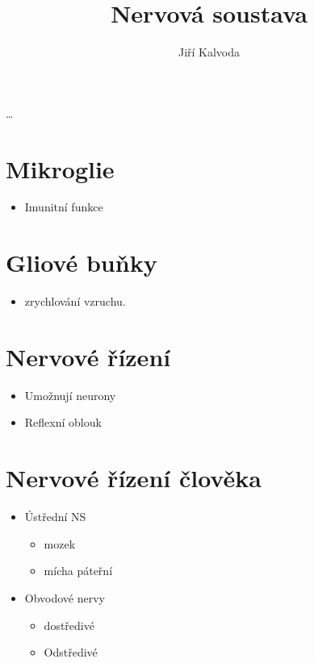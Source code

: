 \documentclass[a4]{article}
\title{Nervová soustava}
\author{Jiří Kalvoda}
\begin{document}
\maketitle
{\huge\dots}
\section{Mikroglie}
\begin{itemize}
	\item Imunitní funkce
\end{itemize}
\section{Gliové buňky}
\begin{itemize}
	\item zrychlování vzruchu.
\end{itemize}
\section{Nervové řízení}
\begin{itemize}
	\item Umožnují neurony
	\item Reflexní oblouk
\end{itemize}
\section{Nervové řízení člověka}
\begin{itemize}
	\item Ústřední NS
\begin{itemize}
	\item mozek
	\item mícha páteřní
\end{itemize}
\item Obvodové nervy
	\begin{itemize}
		\item dostředivé
		\item Odstředivé
	\end{itemize}
\end{itemize}
\end{document}
